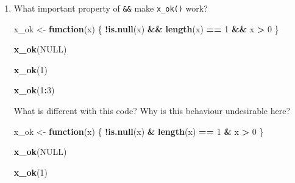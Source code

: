 \documentclass[]{book}
\newenvironment{Shaded}{\begin{snugshade}}{\end{snugshade}}
\newcommand{\KeywordTok}[1]{\textcolor[rgb]{0.13,0.29,0.53}{\textbf{#1}}}
\newcommand{\DecValTok}[1]{\textcolor[rgb]{0.00,0.00,0.81}{#1}}
\newcommand{\StringTok}[1]{\textcolor[rgb]{0.31,0.60,0.02}{#1}}
\newcommand{\OtherTok}[1]{\textcolor[rgb]{0.56,0.35,0.01}{#1}}
\newcommand{\ControlFlowTok}[1]{\textcolor[rgb]{0.13,0.29,0.53}{\textbf{#1}}}
\newcommand{\OperatorTok}[1]{\textcolor[rgb]{0.81,0.36,0.00}{\textbf{#1}}}
\newcommand{\NormalTok}[1]{#1}
\theoremstyle{definition}
\theoremstyle{definition}
\theoremstyle{definition}
\theoremstyle{remark}
\begin{document}
\begin{enumerate}
\def\labelenumi{\arabic{enumi}.}
\item
  What important property of \texttt{\&\&} make \texttt{x\_ok()} work?

\begin{Shaded}
\begin{Highlighting}[]
\NormalTok{x_ok <-}\StringTok{ }\ControlFlowTok{function}\NormalTok{(x) \{}
  \OperatorTok{!}\KeywordTok{is.null}\NormalTok{(x) }\OperatorTok{&&}\StringTok{ }\KeywordTok{length}\NormalTok{(x) }\OperatorTok{==}\StringTok{ }\DecValTok{1} \OperatorTok{&&}\StringTok{ }\NormalTok{x }\OperatorTok{>}\StringTok{ }\DecValTok{0}
\NormalTok{\}}

\KeywordTok{x_ok}\NormalTok{(}\OtherTok{NULL}\NormalTok{)}
\end{Highlighting}
\end{Shaded}

\begin{Shaded}
\begin{Highlighting}[]
\KeywordTok{x_ok}\NormalTok{(}\DecValTok{1}\NormalTok{)}
\end{Highlighting}
\end{Shaded}

\begin{Shaded}
\begin{Highlighting}[]
\KeywordTok{x_ok}\NormalTok{(}\DecValTok{1}\OperatorTok{:}\DecValTok{3}\NormalTok{)}
\end{Highlighting}
\end{Shaded}

  What is different with this code? Why is this behaviour undesirable
  here?

\begin{Shaded}
\begin{Highlighting}[]
\NormalTok{x_ok <-}\StringTok{ }\ControlFlowTok{function}\NormalTok{(x) \{}
  \OperatorTok{!}\KeywordTok{is.null}\NormalTok{(x) }\OperatorTok{&}\StringTok{ }\KeywordTok{length}\NormalTok{(x) }\OperatorTok{==}\StringTok{ }\DecValTok{1} \OperatorTok{&}\StringTok{ }\NormalTok{x }\OperatorTok{>}\StringTok{ }\DecValTok{0}
\NormalTok{\}}

\KeywordTok{x_ok}\NormalTok{(}\OtherTok{NULL}\NormalTok{)}
\end{Highlighting}
\end{Shaded}

\begin{Shaded}
\begin{Highlighting}[]
\KeywordTok{x_ok}\NormalTok{(}\DecValTok{1}\NormalTok{)}
\end{Highlighting}
\end{Shaded}


\end{enumerate}
\end{document}
